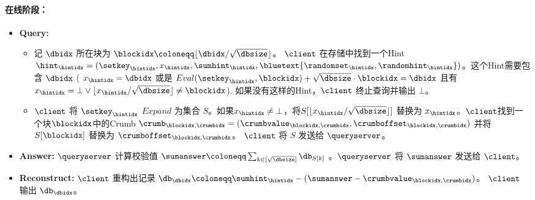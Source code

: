 \begin{mdframed}
        \paragraph{在线阶段：}
        \begin{itemize}
            \item \textbf{Query:}
                  \begin{itemize}
                      \item 记 $\dbidx$ 所在块为 $\blockidx\coloneqq \lfloor \dbidx/\sqrt{\dbsize}\rfloor$。  $\client$ 在存储中找到一个Hint $\hint_\hintidx = (\setkey_\hintidx,x_\hintidx,\sumhint_\hintidx,\bluetext{\randomset_\hintidx,\randomhint_\hintidx})$。这个Hint需要包含 $\dbidx$ ( $x_\hintidx=\dbidx$ 或是 $Eval(\setkey_\hintidx, \blockidx) + \sqrt{\dbsize}\cdot \blockidx = \dbidx $ 且有 $x_\hintidx = \bot \vee \lfloor x_\hintidx/\sqrt{\dbsize}\rfloor\neq \blockidx$). 如果没有这样的Hint，$\client$ 终止查询并输出 $\bot$。
                      \item $\client$ 将 $\setkey_\hintidx$ $Expand$ 为集合 $S$。如果$x_\hintidx\neq \bot$，将$S[\lfloor x_\hintidx/\sqrt{\dbsize}\rfloor]$ 替换为 $x_\hintidx$。$\client$找到一个块$\blockidx$中的Crumb $\crumb_{\blockidx, \crumbidx}=(\crumbvalue_{\blockidx, \crumbidx},\crumboffset_{\blockidx, \crumbidx})$ 并将 $S[\blockidx]$ 替换为  $\crumboffset_{\blockidx, \crumbidx}$。  $\client$ 将 $S$  发送给 $\queryserver$。
                  \end{itemize}
            \item \textbf{Answer:} $\queryserver$ 计算校验值 $\sumanswer\coloneqq \sum_{k\in [\sqrt{\dbsize}]}\db_{S[k]}$ 。$\queryserver$ 将 $\sumanswer$  发送给 $\client$。
            \item \textbf{Reconstruct:} $\client$ 重构出记录 $\db_\dbidx \coloneqq  \sumhint_\hintidx-(\sumanswer-\crumbvalue_{\blockidx, \crumbidx})$。  $\client$ 输出 $\db_\dbidx$。

\end{itemize}
\end{mdframed}
